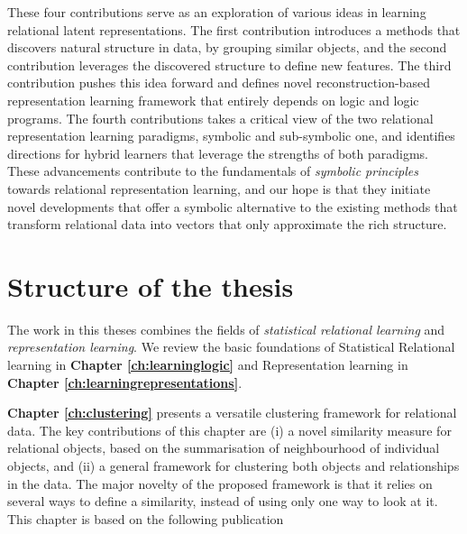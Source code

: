These four contributions serve as an exploration of various ideas in learning relational latent representations.
The first contribution introduces a methods that discovers natural structure in data, by grouping similar objects, and the second contribution leverages the discovered structure to define new features.
The third contribution pushes this idea forward and defines novel reconstruction-based representation learning framework that entirely depends on logic and logic programs.
The fourth contributions takes a critical view of the two relational representation learning paradigms, symbolic and sub-symbolic one, and identifies directions for hybrid learners that leverage the strengths of both paradigms.
These advancements contribute to the fundamentals of \textit{symbolic principles} towards relational representation learning, and our hope is that they initiate novel developments that offer a symbolic alternative to the existing methods that transform relational data into vectors that only approximate the rich structure.





\section{Structure of the thesis}


The work in this theses combines the fields of \textit{statistical relational learning} and \textit{representation learning}.
We review the basic foundations of Statistical Relational learning in \textbf{Chapter \ref{ch:learninglogic}} and Representation learning in \textbf{Chapter \ref{ch:learningrepresentations}}.


\textbf{Chapter \ref{ch:clustering}} presents a versatile clustering framework for relational data.
The key contributions of this chapter are (i) a novel similarity measure for relational objects, based on the summarisation of neighbourhood of individual objects, and (ii) a general framework for clustering both objects and relationships in the data.
The major novelty of the proposed framework is that it relies on several ways to define a similarity, instead of using only one way to look at it.
This chapter is based on the following publication

\begin{quote}
\end{quote}





